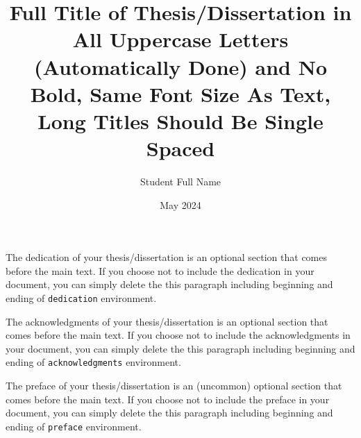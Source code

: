 \documentclass[master,fulldocument,hideabstract,nosecnum,nohyphenation,pdfonly,boundcover]{uofm}
\title{Full Title of Thesis/Dissertation in All Uppercase Letters (Automatically Done) and No Bold, Same Font Size As Text, Long Titles Should Be Single Spaced}
\author{Student Full Name}
\date{May 2024}
\begin{document}
\maketitle

\frontmatter

\copyrightpage %

\begin{dedication} %
    The dedication of your thesis/dissertation is an optional section that comes before the main text. If you choose not to include the dedication in your document, you can simply delete the this paragraph including beginning and ending of \verb|dedication| environment.
\end{dedication}

\begin{acknowledgments} %
    The acknowledgments of your thesis/dissertation is an optional section that comes before the main text. If you choose not to include the acknowledgments in your document, you can simply delete the this paragraph including beginning and ending of \verb|acknowledgments| environment.
\end{acknowledgments}

\begin{preface} %
    The preface of your thesis/dissertation is an (uncommon) optional section that comes before the main text. If you choose not to include the preface in your document, you can simply delete the this paragraph including beginning and ending of \verb|preface| environment.
\end{preface}
\end{document}
